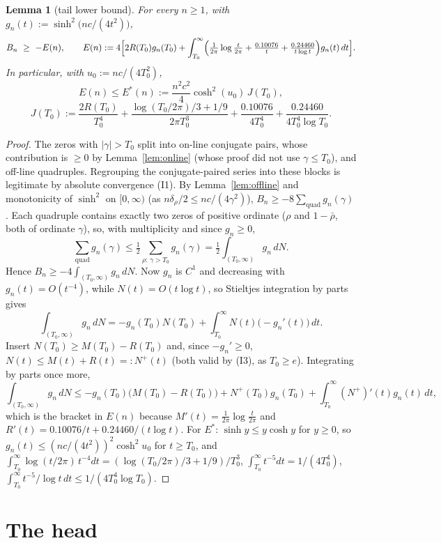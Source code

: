 \documentclass[11pt]{article}
\newtheorem{lemma}[theorem]{Lemma}
\theoremstyle{remark}
\begin{document}
\begin{lemma}[tail lower bound]\label{lem:tail}
For every $n\ge1$, with $g_n(t):=\sinh^2\bigl(nc/(4t^2)\bigr)$,
\[
B_n\ \ge\ -E(n),\qquad E(n):=4\Bigl[2R(T_0)g_n(T_0)+\int_{T_0}^\infty\Bigl(\tfrac1{2\pi}\log\tfrac{t}{2\pi}+\tfrac{0.10076}{t}+\tfrac{0.24460}{t\log t}\Bigr)g_n(t)\,dt\Bigr].
\]
In particular, with $u_0:=nc/(4T_0^2)$,
\[
E(n)\le E^*(n):=\frac{n^2c^2}{4}\cosh^2(u_0)\,J(T_0),
\]
\[
J(T_0):=\frac{2R(T_0)}{T_0^4}+\frac{\log(T_0/2\pi)/3+1/9}{2\pi T_0^3}+\frac{0.10076}{4T_0^4}+\frac{0.24460}{4T_0^4\log T_0}.
\]
\end{lemma}
\begin{proof}
The zeros with $|\gamma|>T_0$ split into on-line conjugate pairs, whose contribution is $\ge0$ by Lemma~\ref{lem:online} (whose proof did not use $\gamma\le T_0$), and off-line quadruples. Regrouping the conjugate-paired series into these blocks is legitimate by absolute convergence (I1). By Lemma~\ref{lem:offline} and monotonicity of $\sinh^2$ on $[0,\infty)$ (as $n\delta_\rho/2\le nc/(4\gamma^2)$), $B_n\ge-8\sum_{\mathrm{quad}}g_n(\gamma)$. Each quadruple contains exactly two zeros of positive ordinate ($\rho$ and $1-\bar\rho$, both of ordinate $\gamma$), so, with multiplicity and since $g_n\ge0$,
\[
\sum_{\mathrm{quad}}g_n(\gamma)\le\tfrac12\sum_{\rho:\,\gamma>T_0}g_n(\gamma)=\tfrac12\int_{(T_0,\infty)}g_n\,dN .
\]
Hence $B_n\ge-4\int_{(T_0,\infty)}g_n\,dN$. Now $g_n$ is $C^1$ and decreasing with $g_n(t)=O(t^{-4})$, while $N(t)=O(t\log t)$, so Stieltjes integration by parts gives
\[
\int_{(T_0,\infty)}g_n\,dN=-g_n(T_0)N(T_0)+\int_{T_0}^\infty N(t)\bigl(-g_n'(t)\bigr)\,dt .
\]
Insert $N(T_0)\ge M(T_0)-R(T_0)$ and, since $-g_n'\ge0$, $N(t)\le M(t)+R(t)=:N^+(t)$ (both valid by (I3), as $T_0\ge e$). Integrating by parts once more,
\[
\int_{(T_0,\infty)}g_n\,dN\le-g_n(T_0)\bigl(M(T_0)-R(T_0)\bigr)+N^+(T_0)g_n(T_0)+\int_{T_0}^\infty (N^+)'(t)g_n(t)\,dt,
\]
which is the bracket in $E(n)$ because $M'(t)=\frac1{2\pi}\log\frac t{2\pi}$ and $R'(t)=0.10076/t+0.24460/(t\log t)$. For $E^*$: $\sinh y\le y\cosh y$ for $y\ge0$, so $g_n(t)\le(nc/(4t^2))^2\cosh^2u_0$ for $t\ge T_0$, and $\int_{T_0}^\infty\log(t/2\pi)\,t^{-4}dt=(\log(T_0/2\pi)/3+1/9)/T_0^3$, $\int_{T_0}^\infty t^{-5}dt=1/(4T_0^4)$, $\int_{T_0}^\infty t^{-5}/\log t\,dt\le1/(4T_0^4\log T_0)$.
\end{proof}

\section{The head}
\end{document}
